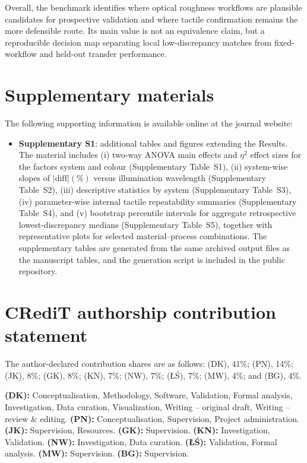 \documentclass{article}
\begin{document}
Overall, the benchmark identifies where optical roughness workflows are plausible candidates for prospective validation and where tactile confirmation remains the more defensible route. Its main value is not an equivalence claim, but a reproducible decision map separating local low-discrepancy matches from fixed-workflow and held-out transfer performance.

\section*{Supplementary materials}
The following supporting information is available online at the journal website:
\begin{itemize}
	\item \textbf{Supplementary S1}: additional tables and figures extending the Results. The material includes (i) two-way ANOVA main effects and $\eta^2$ effect sizes for the factors system and colour (Supplementary Table~S1), (ii) system-wise slopes of $|\mathrm{diff}|(\%)$ versus illumination wavelength (Supplementary Table~S2), (iii) descriptive statistics by system (Supplementary Table~S3), (iv) parameter-wise internal tactile repeatability summaries (Supplementary Table~S4), and (v) bootstrap percentile intervals for aggregate retrospective lowest-discrepancy medians (Supplementary Table~S5), together with representative plots for selected material--process combinations. The supplementary tables are generated from the same archived output files as the manuscript tables, and the generation script is included in the public repository.
\end{itemize}

\section*{CRediT authorship contribution statement}

The author-declared contribution shares are as follows: (DK), 41\%; (PN), 14\%; (JK), 8\%; (GK), 8\%; (KN), 7\%; (NW), 7\%; ({\L}{\'S}), 7\%; (MW), 4\%; and (BG), 4\%.

\noindent\textbf{(DK):} Conceptualisation, Methodology, Software, Validation, Formal analysis, Investigation, Data curation, Visualization, Writing -- original draft, Writing -- review \& editing.
\textbf{(PN):} Conceptualisation, Supervision, Project administration.
\textbf{(JK):} Supervision, Resources.
\textbf{(GK):} Supervision.
\textbf{(KN):} Investigation, Validation.
\textbf{(NW):} Investigation, Data curation.
\textbf{({\L}{\'S}):} Validation, Formal analysis.
\textbf{(MW):} Supervision.
\textbf{(BG):} Supervision.
\end{document}
